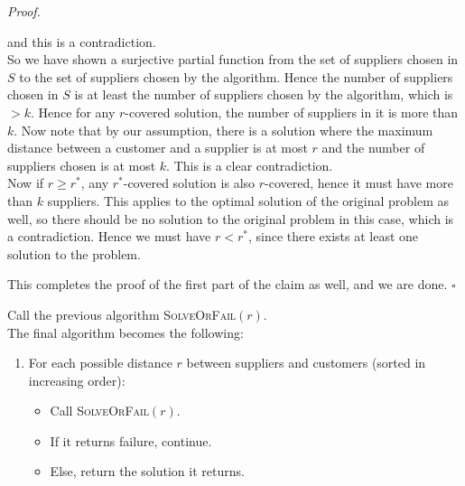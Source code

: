\documentclass[a4paper]{article}
\newenvironment{proof}{\begin{breakbox}\textit{Proof.}}{\hfill$\square$\end{breakbox}}
\newcommand{\nl}{\vspace{0.2cm}\\}
\begin{document}
\begin{proof}
\begin{enumerate}
        and this is a contradiction.\nl
        So we have shown a surjective partial function from the set of suppliers chosen in $S$ to the set of suppliers chosen by the algorithm. Hence the number of suppliers chosen in $S$ is
        at least the number of suppliers chosen by the algorithm, which is $> k$. Hence for any $r$-covered solution, the number of suppliers in it is more than $k$. Now note that by our
        assumption, there is a solution where the maximum distance between a customer and a supplier is at most $r$ and the number of suppliers chosen is at most $k$. This is a clear contradiction.\nl
        Now if $r \ge r^*$, any $r^*$-covered solution is also $r$-covered, hence it must have more than $k$ suppliers. This applies to the optimal solution of the original problem as well, so
        there should be no solution to the original problem in this case, which is a contradiction. Hence we must have $r < r^*$, since there exists at least one solution to the problem.
    \end{enumerate}
    This completes the proof of the first part of the claim as well, and we are done.
\end{proof}

Call the previous algorithm \textsc{SolveOrFail}$(r)$.\nl
The final algorithm becomes the following:
\begin{enumerate}
    \item For each possible distance $r$ between suppliers and customers (sorted in increasing order):
        \begin{itemize}
            \item Call \textsc{SolveOrFail}$(r)$.
            \item If it returns failure, continue.
            \item Else, return the solution it returns.
        \end{itemize}
\end{enumerate}
\end{document}
